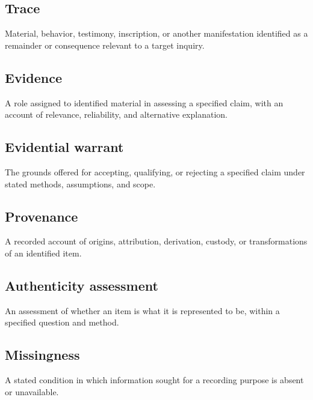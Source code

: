 \documentclass[11pt,a4paper]{article}
\begin{document}
\subsection{Trace}
Material, behavior, testimony, inscription, or another manifestation identified as a remainder or consequence relevant to a target inquiry.

\subsection{Evidence}
A role assigned to identified material in assessing a specified claim, with an account of relevance, reliability, and alternative explanation.

\subsection{Evidential warrant}
The grounds offered for accepting, qualifying, or rejecting a specified claim under stated methods, assumptions, and scope.

\subsection{Provenance}
A recorded account of origins, attribution, derivation, custody, or transformations of an identified item.

\subsection{Authenticity assessment}
An assessment of whether an item is what it is represented to be, within a specified question and method.

\subsection{Missingness}
A stated condition in which information sought for a recording purpose is absent or unavailable.
\end{document}
